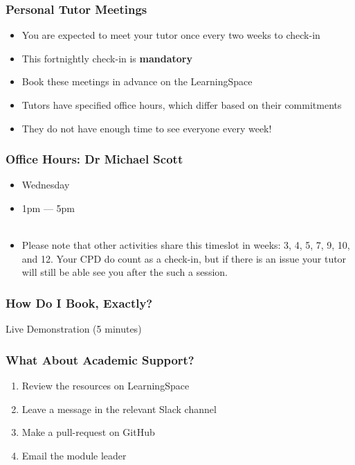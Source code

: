 \begin{frame}
	\frametitle{Personal Tutor Meetings}	
	\begin{itemize}
		\item You are expected to meet your tutor once every two weeks to check-in
		\item This fortnightly check-in is \textbf{mandatory}
		\item Book these meetings in advance on the LearningSpace
		
		\item Tutors have specified office hours, which differ based on their commitments
		\item They do not have enough time to see everyone every week! 
	\end{itemize}
\end{frame}

\begin{frame}
	\frametitle{Office Hours: Dr Michael Scott}	
	\begin{itemize}
		\item Wednesday
		\item 1pm --- 5pm
		\\~\\
		\item Please note that other activities share this timeslot in weeks: 3, 4, 5, 7, 9, 10, and 12. Your CPD do count as a check-in, but if there is an issue your tutor will still be able see you after the such a session.
	\end{itemize}
\end{frame}

\begin{frame}
	\frametitle{How Do I Book, Exactly?}	
	\begin{center}
		Live Demonstration (5 minutes)
	\end{center}
\end{frame}

\begin{frame}
	\frametitle{What About Academic Support?}	
	\begin{enumerate}
		\item Review the resources on LearningSpace
		\item Leave a message in the relevant Slack channel
		\item Make a pull-request on GitHub
		\item Email the module leader
	\end{enumerate}
\end{frame}

